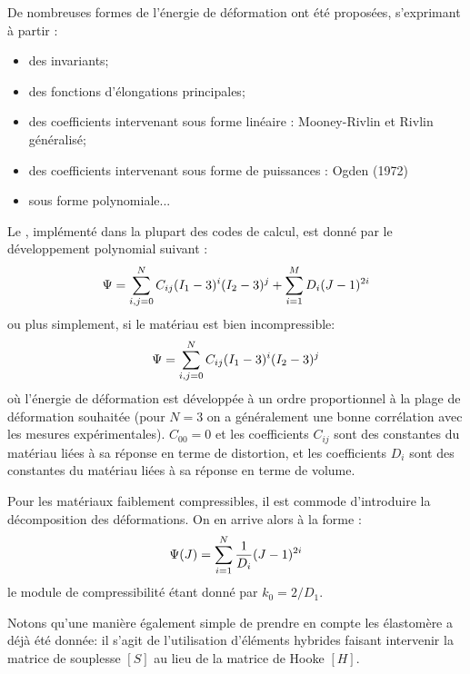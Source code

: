 De nombreuses formes de l'énergie de déformation ont été proposées, s'exprimant à partir :
\begin{itemize}
	\item des invariants;
	\item des fonctions d'élongations principales;
	\item des coefficients intervenant sous forme linéaire : Mooney-Rivlin 
	et Rivlin généralisé;
	\item des coefficients intervenant sous forme de puissances : Ogden (1972)
	\item sous forme polynomiale...
\end{itemize}

\medskip
Le , 
implémenté dans la plupart des codes de calcul, est donné par le développement polynomial suivant :
\begin{equation}
\Psi = \displaystyle\sum\limits_{i,j=0}^N C_{ij}(I_1-3)^i(I_2-3)^j + \displaystyle\sum_{i=1}^M D_i(J-1)^{2i}
\end{equation}
ou plus simplement, si le matériau est bien incompressible:
\begin{equation}
\Psi = \displaystyle\sum\limits_{i,j=0}^N C_{ij}(I_1-3)^i(I_2-3)^j
\end{equation}
où l'énergie de déformation est développée à un ordre proportionnel à la plage
de déformation souhaitée (pour $N=3$ on a généralement une bonne corrélation
avec les mesures expérimentales).
$C_{00}=0$ et les coefficients $C_{ij}$ sont des constantes du matériau liées à sa réponse
en terme de distortion, et les coefficients $D_i$ sont des constantes du matériau liées à sa réponse
en terme de volume.

\medskip
Pour les matériaux faiblement compressibles, il est commode d'introduire la
décomposition des déformations.
On en arrive alors à la forme :
\begin{equation}
\Psi(J) = \displaystyle\sum\limits_{i=1}^N \dfrac1{D_i}(J-1)^{2i}
\end{equation}
le module de compressibilité étant donné par $k_0=2/D_1$.


\medskip
Notons qu'une manière également simple de prendre en compte les élastomère a
déjà été donnée: il s'agit de l'utilisation d'éléments hybrides faisant intervenir 
la matrice de souplesse $[S]$ au lieu de la matrice de Hooke $[H]$.






